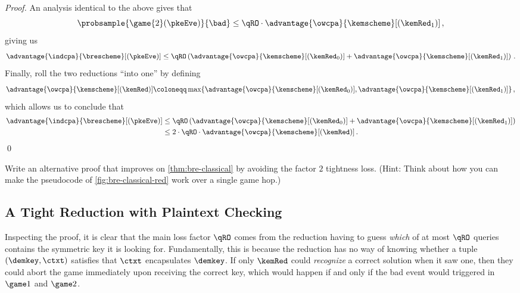 \begin{proof}
      An analysis identical to the above gives that
      \[
        \probsample{\game{2}(\pkeEve)}{\bad} \leq \qRO \cdot
        \advantage{\owcpa}{\kemscheme}[(\kemRed_1)]\, ,
      \]
      giving us 
      \[
        \advantage{\indcpa}{\brescheme}[(\pkeEve)] 
          \leq \qRO \left( 
            \advantage{\owcpa}{\kemscheme}[(\kemRed_0)]
            + \advantage{\owcpa}{\kemscheme}[(\kemRed_1)]
          \right)\, .
      \]
      Finally, roll the two reductions ``into one'' by defining
      \[
        \advantage{\owcpa}{\kemscheme}[(\kemRed)] \coloneqq 
          \max \{
            \advantage{\owcpa}{\kemscheme}[(\kemRed_0)],
            \advantage{\owcpa}{\kemscheme}[(\kemRed_1)]
          \}\, ,
      \]
      which allows us to conclude that
      \begin{align*}
        \advantage{\indcpa}{\brescheme}[(\pkeEve)] 
          &\leq 
          \qRO \left( 
            \advantage{\owcpa}{\kemscheme}[(\kemRed_0)]
            + \advantage{\owcpa}{\kemscheme}[(\kemRed_1)]
          \right) \\
          &\leq 2\cdot\qRO\cdot\advantage{\owcpa}{\kemscheme}[(\kemRed)]\, .
      \end{align*}
      \qed
    \end{proof}

    \begin{exercise}
      Write an alternative proof that improves on \cref{thm:bre-classical} by
        avoiding the factor $2$ tightness loss. 
        (Hint: Think about how you can make the pseudocode of
        \cref{fig:bre-classical-red} work over a single game hop.)
    \end{exercise}

  \subsection{A Tight Reduction with Plaintext Checking}
    Inspecting the proof, it is clear that the main loss factor $\qRO$ comes
      from the reduction
      having to guess \emph{which} of at most $\qRO$ queries contains the
      symmetric key it is looking for. Fundamentally, this is because the reduction
      has no way of knowing whether a tuple $(\demkey, \ctxt)$ satisfies that
      $\ctxt$ encapsulates $\demkey$. If only $\kemRed$ could
      \emph{recognize} a correct solution when it saw one, then they could abort the game
      immediately upon receiving the correct key, which would happen if and only
      if the bad event would triggered in $\game 1$ and $\game 2$.

